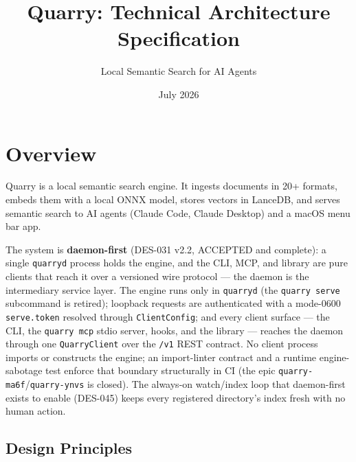 \documentclass[a4paper,10pt]{article}
\begin{document}
\title{Quarry: Technical Architecture Specification}
\author{Local Semantic Search for AI Agents}
\date{July 2026}
\maketitle

\tableofcontents
\newpage

\section{Overview}

Quarry is a local semantic search engine.  It ingests documents in
20+ formats, embeds them with a local ONNX model, stores vectors in
LanceDB, and serves semantic search to AI agents (Claude Code, Claude
Desktop) and a macOS menu bar app.

The system is \textbf{daemon-first} (DES-031 v2.2, ACCEPTED and
complete): a single \texttt{quarryd} process holds the engine, and the
CLI, MCP, and library are pure clients that reach it over a versioned
wire protocol --- the daemon is the intermediary service layer.  The
engine runs only in \texttt{quarryd} (the \texttt{quarry serve}
subcommand is retired); loopback requests are authenticated with a
mode-0600 \texttt{serve.token} resolved through \texttt{ClientConfig};
and every client surface --- the CLI, the \texttt{quarry mcp} stdio
server, hooks, and the library --- reaches the daemon through one
\texttt{QuarryClient} over the \texttt{/v1} REST contract.  No client
process imports or constructs the engine; an import-linter contract and
a runtime engine-sabotage test enforce that boundary structurally in CI
(the epic \texttt{quarry-ma6f}/\texttt{quarry-ynvs} is closed).  The
always-on watch/index loop that daemon-first exists to enable (DES-045)
keeps every registered directory's index fresh with no human action.

\subsection{Design Principles}
\end{document}
